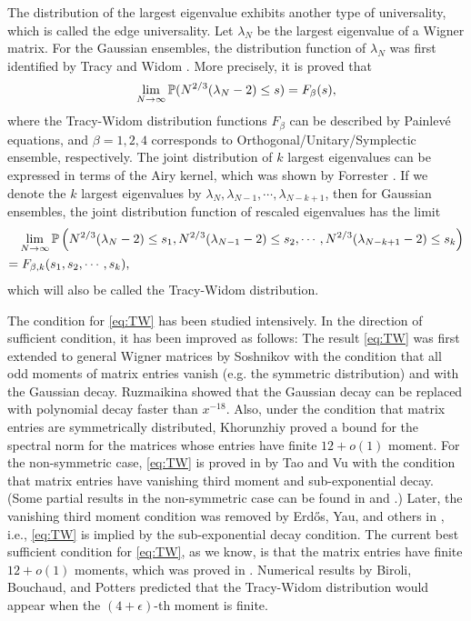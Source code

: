 The distribution of the largest eigenvalue exhibits another type of universality, which is called the edge universality. Let $\lambda_N$ be the largest eigenvalue of a Wigner matrix. For the Gaussian ensembles, the distribution function of $\lambda_N$ was first identified by Tracy and Widom \cite{TR1, TR2}. More precisely, it is proved that
\begin{equation}
\lim_{N \to \infty} \mathbb{P} (N^{2/3} (\lambda_N - 2) \leq s ) = F_{\beta} (s),
\end{equation}
where the Tracy-Widom distribution functions $F_{\beta}$ can be described by Painlev\'e equations, and $\beta = 1, 2, 4$ corresponds to Orthogonal/Unitary/Symplectic ensemble, respectively. The joint distribution of $k$ largest eigenvalues can be expressed in terms of the Airy kernel, which was shown by Forrester \cite{F}. If we denote the $k$ largest eigenvalues by $\lambda_N, \lambda_{N-1}, \cdots, \lambda_{N-k+1}$, then for Gaussian ensembles, the joint distribution function of rescaled eigenvalues has the limit
\begin{equation} \begin{split} \label{eq:TW}
& \lim_{N \to \infty} \mathbb{P} \left( N^{2/3} (\lambda_{N} -2) \leq s_1, N^{2/3} (\lambda_{N-1} -2) \leq s_2, \cdots, N^{2/3} (\lambda_{N-k+1} -2) \leq s_k \right) \\
 = &\;F_{\beta, k} (s_1, s_2, \cdots, s_k),
\end{split} \end{equation}
which will also be called the Tracy-Widom distribution.

The condition for \eqref{eq:TW} has been studied intensively. In the direction of sufficient condition, it has been improved as follows: The result \eqref{eq:TW} was first extended to general Wigner matrices by Soshnikov \cite{S1} with the condition that all odd moments of matrix entries vanish (e.g. the symmetric distribution) and with the Gaussian decay. Ruzmaikina \cite{R} showed that the Gaussian decay can be replaced with polynomial decay faster than $x^{-18}$. Also, under the condition that matrix entries are symmetrically distributed, Khorunzhiy \cite{OK} proved a bound for the spectral norm for the matrices whose entries have finite $12+o(1)$ moment. For the non-symmetric case, \eqref{eq:TW} is proved in \cite{TV2} by Tao and Vu with the condition that matrix entries have vanishing third moment and sub-exponential decay. (Some partial results in the non-symmetric case can be found in \cite{P2} and \cite{P3}.) Later, the vanishing third moment condition was removed by Erd\H{o}s, Yau, and others in \cite{EYY, EKYY2}, i.e., \eqref{eq:TW} is implied by the sub-exponential decay condition. The current best sufficient condition for \eqref{eq:TW}, as we know, is that the matrix entries have finite $12+o(1)$ moments, which was proved in \cite{EKYY2}. Numerical results by Biroli, Bouchaud, and Potters \cite{BBP} predicted that the Tracy-Widom distribution would appear when the $(4 + \epsilon)$-th moment is finite.

